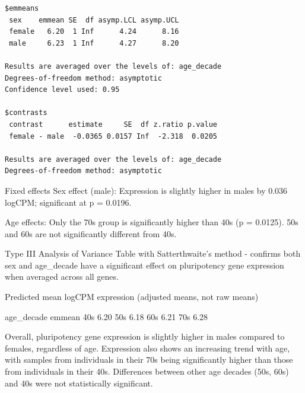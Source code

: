 \documentclass[
  letterpaper,
  DIV=11,
  numbers=noendperiod]{scrartcl}
\begin{document}
\begin{verbatim}
$emmeans
 sex    emmean SE  df asymp.LCL asymp.UCL
 female   6.20  1 Inf      4.24      8.16
 male     6.23  1 Inf      4.27      8.20

Results are averaged over the levels of: age_decade 
Degrees-of-freedom method: asymptotic 
Confidence level used: 0.95 

$contrasts
 contrast      estimate     SE  df z.ratio p.value
 female - male  -0.0365 0.0157 Inf  -2.318  0.0205

Results are averaged over the levels of: age_decade 
Degrees-of-freedom method: asymptotic 
\end{verbatim}

Fixed effects Sex effect (male): Expression is slightly higher in males
by 0.036 logCPM; significant at p = 0.0196.

Age effects: Only the 70s group is significantly higher than 40s (p =
0.0125). 50s and 60s are not significantly different from 40s.

Type III Analysis of Variance Table with Satterthwaite's method -
confirms both sex and age\_decade have a significant effect on
pluripotency gene expression when averaged across all genes.

Predicted mean logCPM expression (adjusted means, not raw means)

age\_decade emmean 40s 6.20 50s 6.18 60s 6.21 70s 6.28

Overall, pluripotency gene expression is slightly higher in males
compared to females, regardless of age. Expression also shows an
increasing trend with age, with samples from individuals in their 70s
being significantly higher than those from individuals in their 40s.
Differences between other age decades (50s, 60s) and 40s were not
statistically significant.
\end{document}
